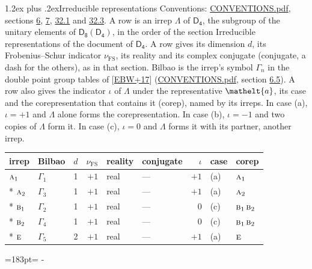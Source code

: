 \documentclass[10pt,a4paper]{article}
\makeatletter
\renewcommand\section{\@startsection{section}{1}{\z@}{-3ex plus -1ex minus -.2ex}%
  {1.2ex plus .2ex}{\normalfont\large\sffamily\bfseries\color{parttitle}}}
\newcommand{\needspace}[1]{\par\penalty-100\begingroup\dimen0=#1\relax\dimen2=\pagegoal
  \advance\dimen2-\pagetotal\ifdim\dimen0>\dimen2\relax\ifdim\dimen2>0pt\vfil\break\fi\fi
  \endgroup}
\numberwithin{equation}{section}
\newcommand{\eltfont}[1]{{\let\sigma\eltsigma\mathelt{#1}}}
\newcommand{\grp}[1]{\mathsf{#1}}
\newcommand{\irr}[1]{\text{\normalfont\scshape #1}}
\newcommand{\elt}[1]{\eltfont{#1}}
\newcommand{\fsind}{\nu_{\mathrm{FS}}}
\makeatother
\begin{document}
\section{Irreducible representations}\label{s:irreps}
Conventions: \href{../../CONVENTIONS.pdf}{CONVENTIONS.pdf}, sections \href{../../../rotation/CONVENTIONS.pdf\#conv.6}{6}, \href{../../../rotation/CONVENTIONS.pdf\#conv.7}{7}, \href{../../CONVENTIONS.pdf\#conv.32.1}{32.1} and \href{../../CONVENTIONS.pdf\#conv.32.3}{32.3}.
\leavevmode\label{n:irrep.Delta}A row is an irrep $\Lambda$ of $\grp{D_{4}}$, the subgroup of the unitary elements of $\grp{D_{8}}(\grp{D_{4}})$, in the order of the section Irreducible representations of the document of \href{../../../rotation/data/pdf/D4.pdf}{$\grp{D_{4}}$}. \label{n:index.dimension}\label{n:index.frobenius}\label{n:head.irrep}\label{n:head.reality}\label{n:head.conjugate}A row gives its dimension $d$, its Frobenius--Schur indicator $\fsind$, its reality and its complex conjugate (conjugate, a dash for the others), as in that section. \label{n:head.bilbao}\label{n:irrep.alias.gamma}Bilbao is the irrep's symbol $\Gamma_n$ in the double point group tables of [\href{../../../REFERENCES.pdf\#ref.EBW+17}{EBW+17}] (\href{../../CONVENTIONS.pdf}{CONVENTIONS.pdf}, section \href{../../../rotation/CONVENTIONS.pdf\#conv.6.5}{6.5}). \label{n:head.case.corep}\label{n:head.corep}A row also gives the indicator $\iota$ of $\Lambda$ under the representative $\elt{a}$, its case and the corepresentation that contains it (corep), named by its irreps. In case (a), $\iota = +1$ and $\Lambda$ alone forms the corepresentation. In case (b), $\iota = -1$ and two copies of $\Lambda$ form it. In case (c), $\iota = 0$ and $\Lambda$ forms it with its partner, another irrep.
\setlength{\emergencystretch}{2em}\par\setlength{\emergencystretch}{0pt}
{\small\renewcommand{\arraystretch}{1.25}\setlength{\tabcolsep}{4pt}\begin{longtable}{@{}llrrllrll@{}}\toprule
irrep & Bilbao & $d$ & $\fsind$ & reality & conjugate & $\iota$ & case & corep\\\midrule\endhead
\bottomrule\endfoot\endlastfoot
$\irr{a}_{1}$ & $\Gamma_{1}$ & 1 & $+1$ & real & --- & $+1$ & (a) & $\irr{a}_{1}$\\*
$\irr{a}_{2}$ & $\Gamma_{3}$ & 1 & $+1$ & real & --- & $+1$ & (a) & $\irr{a}_{2}$\\*
$\irr{b}_{1}$ & $\Gamma_{2}$ & 1 & $+1$ & real & --- & $0$ & (c) & $\irr{b}_{1}\,\irr{b}_{2}$\\*
$\irr{b}_{2}$ & $\Gamma_{4}$ & 1 & $+1$ & real & --- & $0$ & (c) & $\irr{b}_{1}\,\irr{b}_{2}$\\*
$\irr{e}$ & $\Gamma_{5}$ & 2 & $+1$ & real & --- & $+1$ & (a) & $\irr{e}$\\
\bottomrule\end{longtable}}
\needspace{183pt}
\end{document}
